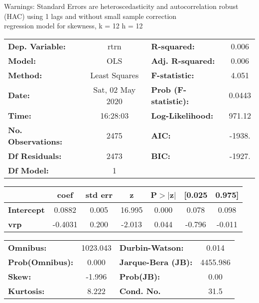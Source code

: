 Warnings: \newline
 [1] Standard Errors are heteroscedasticity and autocorrelation robust (HAC) using 1 lags and without small sample correction\\ 

regression model for skewness, k = 12 h = 12\begin{center}
\begin{tabular}{lclc}
\toprule
\textbf{Dep. Variable:}    &       rtrn       & \textbf{  R-squared:         } &     0.006   \\
\textbf{Model:}            &       OLS        & \textbf{  Adj. R-squared:    } &     0.006   \\
\textbf{Method:}           &  Least Squares   & \textbf{  F-statistic:       } &     4.051   \\
\textbf{Date:}             & Sat, 02 May 2020 & \textbf{  Prob (F-statistic):} &   0.0443    \\
\textbf{Time:}             &     16:28:03     & \textbf{  Log-Likelihood:    } &    971.12   \\
\textbf{No. Observations:} &        2475      & \textbf{  AIC:               } &    -1938.   \\
\textbf{Df Residuals:}     &        2473      & \textbf{  BIC:               } &    -1927.   \\
\textbf{Df Model:}         &           1      & \textbf{                     } &             \\
\bottomrule
\end{tabular}
\begin{tabular}{lcccccc}
                   & \textbf{coef} & \textbf{std err} & \textbf{z} & \textbf{P$> |$z$|$} & \textbf{[0.025} & \textbf{0.975]}  \\
\midrule
\textbf{Intercept} &       0.0882  &        0.005     &    16.995  &         0.000        &        0.078    &        0.098     \\
\textbf{vrp}       &      -0.4031  &        0.200     &    -2.013  &         0.044        &       -0.796    &       -0.011     \\
\bottomrule
\end{tabular}
\begin{tabular}{lclc}
\textbf{Omnibus:}       & 1023.043 & \textbf{  Durbin-Watson:     } &    0.014  \\
\textbf{Prob(Omnibus):} &   0.000  & \textbf{  Jarque-Bera (JB):  } & 4455.986  \\
\textbf{Skew:}          &  -1.996  & \textbf{  Prob(JB):          } &     0.00  \\
\textbf{Kurtosis:}      &   8.222  & \textbf{  Cond. No.          } &     31.5  \\
\bottomrule
\end{tabular}
\end{center}

